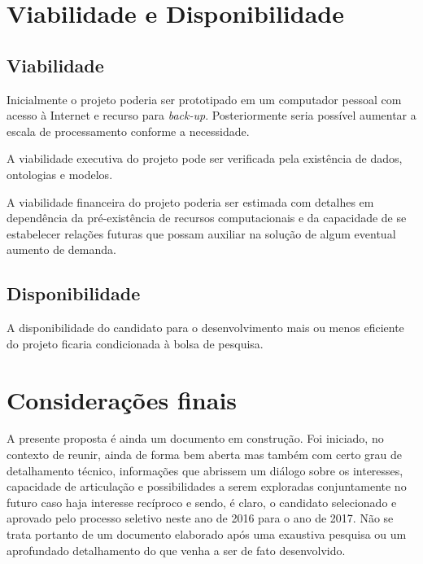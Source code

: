 \documentclass[
	12pt,				%
	openany,			%
	oneside,			%
	a4paper,			%
	english,			%
	french,				%
	spanish,			%
	brazil,				%
	]{abntex2}
\begin{document}
\chapter{Viabilidade e Disponibilidade}

\section{Viabilidade}
Inicialmente o projeto poderia ser prototipado em um computador pessoal com acesso à Internet e recurso para \emph{back-up}. Posteriormente seria possível aumentar a escala de processamento conforme a necessidade.

A viabilidade executiva do projeto pode ser verificada pela existência de dados, ontologias e modelos. 

A viabilidade financeira do projeto poderia ser estimada com detalhes em dependência da pré-existência de recursos computacionais e da capacidade de se estabelecer relações futuras que possam auxiliar na solução de algum eventual aumento de demanda. 

\section{Disponibilidade}

A disponibilidade do candidato para o desenvolvimento mais ou menos eficiente do projeto ficaria condicionada à bolsa de pesquisa.



\chapter*[Considerações finais]{Considerações finais}

A presente proposta é ainda um documento em construção. Foi iniciado, no contexto de reunir, ainda de forma bem aberta mas também com certo grau de detalhamento técnico, informações que abrissem um diálogo sobre os interesses, capacidade de articulação e possibilidades a serem exploradas conjuntamente no futuro caso haja interesse recíproco e sendo, é claro, o candidato selecionado e aprovado pelo processo seletivo neste ano de 2016 para o ano de 2017. Não se trata portanto de um documento elaborado após uma exaustiva pesquisa ou um aprofundado detalhamento do que venha a ser de fato desenvolvido. 
\end{document}
